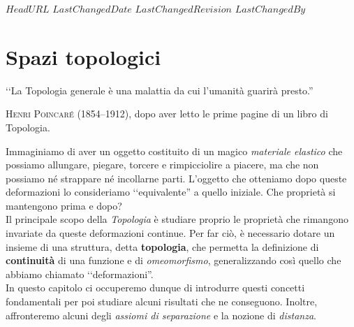 \svnidlong
{$HeadURL$}
{$LastChangedDate$}
{$LastChangedRevision$}
{$LastChangedBy$}

\chapter{Spazi topologici}

\begin{introduction}
‘‘La Topologia generale è una malattia da cui l'umanità guarirà presto.''
\begin{flushright}
	\textsc{Henri Poincaré (1854–1912)}, dopo aver letto le prime pagine di un libro di Topologia.
\end{flushright}
\end{introduction}
\noindent Immaginiamo di aver un oggetto costituito di un magico \emph{materiale elastico} che possiamo allungare, piegare, torcere e rimpicciolire a piacere, ma che non possiamo né strappare né incollarne parti. L'oggetto che otteniamo dopo queste deformazioni lo consideriamo ‘‘equivalente'' a quello iniziale. Che proprietà si mantengono prima e dopo?\\
Il principale scopo della \textit{Topologia} è studiare proprio le proprietà che rimangono invariate da queste deformazioni continue. Per far ciò, è necessario dotare un insieme di una struttura, detta \textbf{topologia}, che permetta la definizione di \textbf{continuità} di una funzione e di \emph{omeomorfismo}, generalizzando così quello che abbiamo chiamato ‘‘deformazioni''.\\
In questo capitolo ci occuperemo dunque di introdurre questi concetti fondamentali per poi studiare alcuni risultati che ne conseguono. Inoltre, affronteremo alcuni degli \emph{assiomi di separazione} e la nozione di \emph{distanza}.
